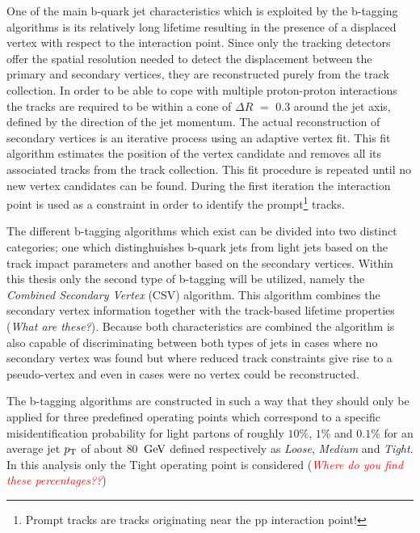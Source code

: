 One of the main b-quark jet characteristics which is exploited by the b-tagging algorithms is its relatively long lifetime resulting in the presence of a displaced vertex with respect to the interaction point. Since only the tracking detectors offer the spatial resolution needed to detect the displacement between the primary and secondary vertices, they are reconstructed purely from the track collection. In order to be able to cope with multiple proton-proton interactions the tracks are required to be within a cone of $\Delta R$ $=$ $0.3$ around the jet axis, defined by the direction of the jet momentum. 
The actual reconstruction of secondary vertices is an iterative process using an adaptive vertex fit. This fit algorithm estimates the position of the vertex candidate and removes all its associated tracks from the track collection. This fit procedure is repeated until no new vertex candidates can be found. During the first iteration the interaction point is used as a constraint in order to identify the prompt\footnote{Prompt tracks are tracks originating near the pp interaction point!} tracks.

The different b-tagging algorithms which exist can be divided into two distinct categories; one which distinghuishes b-quark jets from light jets based on the track impact parameters and another based on the secondary vertices. Within this thesis only the second type of b-tagging will be utilized, namely the \textit{Combined Secondary Vertex} (CSV) algorithm. This algorithm combines the secondary vertex information together with the track-based lifetime properties (\textit{What are these?}). Because both characteristics are combined the algorithm is also capable of discriminating between both types of jets in cases where no secondary vertex was found but where reduced track constraints give rise to a pseudo-vertex and even in cases were no vertex could be reconstructed.

The b-tagging algorithms are constructed in such a way that they should only be applied for three predefined operating points which correspond to a specific misidentification probability for light partons of roughly $10 \%$, $1 \%$ and $0.1 \%$ for an average jet $p_{\rm T}$ of about $80$ $\, \mathrm{GeV}$ defined respectively as \textit{Loose}, \textit{Medium} and \textit{Tight}. In this analysis only the Tight operating point is considered (\textit{\textcolor{red}{Where do you find these percentages??}})


